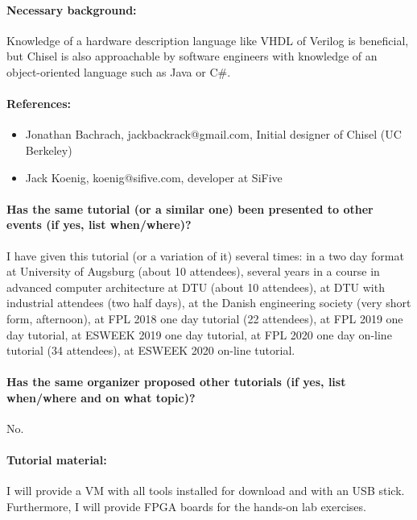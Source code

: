 \documentclass{article}
\begin{document}
 \paragraph{Necessary background:}

Knowledge of a hardware description language like VHDL of Verilog is beneficial, but Chisel is also
approachable by software engineers with knowledge of an object-oriented language such as Java or C\#.

 \paragraph{References:}

\begin{itemize}
\item Jonathan Bachrach, jackbackrack@gmail.com, Initial designer of Chisel (UC Berkeley)
\item Jack Koenig, koenig@sifive.com, developer at SiFive
\end{itemize}

\paragraph{Has the same tutorial (or a similar one) been presented to other events (if yes, list when/where)?}

I have given this tutorial (or a variation of it) several times:
in a two day format at University of Augsburg (about 10 attendees), several years
in a course in advanced computer architecture at DTU (about 10 attendees), at DTU with industrial attendees
(two half days), at the Danish engineering society (very short form, afternoon),
at FPL 2018 one day tutorial (22 attendees), at FPL 2019 one day tutorial,
at ESWEEK 2019 one day tutorial, at FPL 2020 one day on-line tutorial (34 attendees),
at ESWEEK 2020 on-line tutorial.

\paragraph{Has the same organizer proposed other tutorials (if yes, list when/where and on what topic)?}

No.

 \paragraph{Tutorial material:} I will provide a VM with all tools installed for download and with an USB stick. Furthermore, I will provide FPGA boards for the hands-on lab exercises.
 
\end{document}
